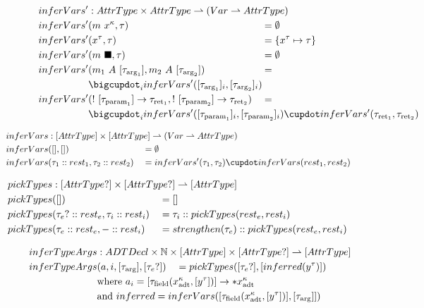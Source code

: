 \begin{alignat*}{3}
	inferVars' &: \mathrlap{AttrType \times AttrType \rightharpoonup (Var \rightharpoonup AttrType)} \\
	inferVars'&(m\ x^\kappa, \tau) &&= \emptyset \\
	inferVars'&(x^\tau, \tau) &&= \{ x^\tau \mapsto \tau \} \\
	inferVars'&(m\ \blacksquare, \tau) &&= \emptyset \\
	inferVars'&(m_1\ A\ [\tau_{\text{arg}_1}], m_2\ A\ [\tau_{\text{arg}_2}]) &&=\\
	&\mathrlap{\bigcupdot_i inferVars'([\tau_{\text{arg}_1}]_i, [\tau_{\text{arg}_2}]_i)} \\
	inferVars'&(!\ [\tau_{\text{param}_1}] \to \tau_{\text{ret}_1}, !\ [\tau_{\text{param}_2}] \to \tau_{\text{ret}_2}) &&= \\
	&\mathrlap{\bigcupdot_i inferVars'([\tau_{\text{param}_1}]_i, [\tau_{\text{param}_2}]_i) \cupdot inferVars'(\tau_{\text{ret}_1}, \tau_{\text{ret}_2})}
\end{alignat*}

\begin{alignat*}{3}
	inferVars &: \mathrlap{[AttrType] \times [AttrType] \rightharpoonup (Var \rightharpoonup AttrType)} \\
	inferVars&([], []) &&= \emptyset \\
	inferVars&(\tau_1 :: rest_1, \tau_2 :: rest_2) &&= inferVars'(\tau_1, \tau_2) \cupdot inferVars(rest_1, rest_2) \\
\end{alignat*}

\begin{alignat*}{3}
	pickTypes &: \mathrlap{[AttrType?] \times [AttrType?] \rightharpoonup [AttrType]} \\
	pickTypes&([]) &&= [] \\
	pickTypes&(\tau_e? :: rest_e, \tau_i :: rest_i) &&= \tau_i :: pickTypes(rest_e, rest_i) \\
	pickTypes&(\tau_e :: rest_e, - :: rest_i) &&= strengthen(\tau_e) :: pickTypes(rest_e, rest_i) \\
\end{alignat*}

\begin{alignat*}{3}
	inferTypeArgs &: \mathrlap{ADTDecl \times \mathbb{N} \times [AttrType] \times [AttrType?] \rightharpoonup [AttrType]} \\
	inferTypeArgs&(a, i, [\tau_\text{arg}], [\tau_e?]) &&= pickTypes([\tau_e?], [inferred(y^\tau)])\\
		& \mathrlap{\text{where } a_i = [\tau_\text{field}(x^\kappa_\text{adt}, [y^\tau])] \to *x^\kappa_\text{adt}} \\
		& \mathrlap{\text{and } inferred = inferVars([\tau_\text{field}(x^\kappa_\text{adt}, [y^\tau])], [\tau_\text{arg}]])}
\end{alignat*}

